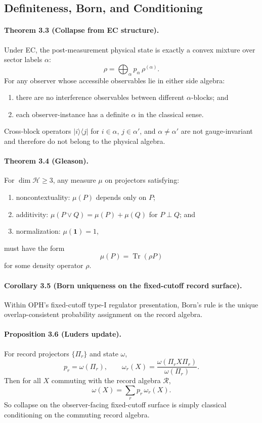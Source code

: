 \subsection{Definiteness, Born, and Conditioning}

\paragraph{\textbf{Theorem 3.3 (Collapse from EC structure).}}
Under EC, the post-measurement physical state is exactly a convex mixture over sector labels
\(\alpha\):
\[
\rho=\bigoplus_\alpha p_\alpha\,\rho^{(\alpha)}.
\]
For any observer whose accessible observables lie in either side algebra:
\begin{enumerate}[leftmargin=2em]
\item there are no interference observables between different \(\alpha\)-blocks; and
\item each observer-instance has a definite \(\alpha\) in the classical sense.
\end{enumerate}
Cross-block operators \(|i\rangle\langle j|\) for \(i\in\alpha\), \(j\in\alpha'\), and
\(\alpha\neq\alpha'\) are not gauge-invariant and therefore do not belong to the physical algebra.

\paragraph{\textbf{Theorem 3.4 (Gleason).}}
For \(\dim \mathcal H\ge 3\), any measure \(\mu\) on projectors satisfying:
\begin{enumerate}[leftmargin=2em]
\item noncontextuality: \(\mu(P)\) depends only on \(P\);
\item additivity: \(\mu(P\vee Q)=\mu(P)+\mu(Q)\) for \(P\perp Q\); and
\item normalization: \(\mu(\mathbf 1)=1\),
\end{enumerate}
must have the form
\[
\mu(P)=\operatorname{Tr}(\rho P)
\]
for some density operator \(\rho\).

\paragraph{\textbf{Corollary 3.5 (Born uniqueness on the fixed-cutoff record surface).}}
Within OPH's fixed-cutoff type-I regulator presentation, Born's rule is the unique
overlap-consistent probability assignment on the record algebra.

\paragraph{\textbf{Proposition 3.6 (Luders update).}}
For record projectors \(\{\Pi_r\}\) and state \(\omega\),
\[
p_r=\omega(\Pi_r),
\qquad
\omega_r(X)=\frac{\omega(\Pi_r X \Pi_r)}{\omega(\Pi_r)}.
\]
Then for all \(X\) commuting with the record algebra \(\mathcal R\),
\[
\omega(X)=\sum_r p_r\,\omega_r(X).
\]
So collapse on the observer-facing fixed-cutoff surface is simply classical conditioning on the
commuting record algebra.
